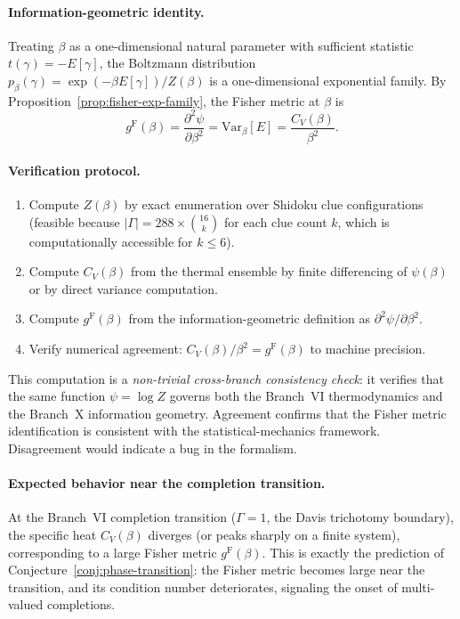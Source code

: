\documentclass[11pt]{article}
\newcommand{\Var}{\mathrm{Var}}
\newcommand{\gF}{g^{\mathrm{F}}}
\theoremstyle{remark}
\begin{document}
\paragraph{Information-geometric identity.}
Treating $\beta$ as a one-dimensional natural parameter with sufficient
statistic $t(\gamma) = -E[\gamma]$, the Boltzmann distribution
$p_\beta(\gamma) = \exp(-\beta E[\gamma])/Z(\beta)$
is a one-dimensional exponential family.  By
Proposition~\ref{prop:fisher-exp-family}, the Fisher metric at $\beta$ is
\[
\gF(\beta) = \frac{\partial^2 \psi}{\partial\beta^2}
= \Var_\beta[E] = \frac{C_V(\beta)}{\beta^2}.
\]

\paragraph{Verification protocol.}
\begin{enumerate}[label=\textnormal{(\arabic*)}, leftmargin=*]
  \item Compute $Z(\beta)$ by exact enumeration over Shidoku clue
  configurations (feasible because $|\Gamma| = 288 \times
  \binom{16}{k}$ for each clue count $k$, which is computationally accessible
  for $k \le 6$).
  \item Compute $C_V(\beta)$ from the thermal ensemble by finite differencing
  of $\psi(\beta)$ or by direct variance computation.
  \item Compute $\gF(\beta)$ from the information-geometric definition as
  $\partial^2 \psi / \partial\beta^2$.
  \item Verify numerical agreement: $C_V(\beta)/\beta^2 = \gF(\beta)$ to
  machine precision.
\end{enumerate}

This computation is a \emph{non-trivial cross-branch consistency check}: it
verifies that the same function $\psi = \log Z$ governs both the Branch~VI
thermodynamics and the Branch~X information geometry.  Agreement confirms that
the Fisher metric identification is consistent with the statistical-mechanics
framework.  Disagreement would indicate a bug in the formalism.

\paragraph{Expected behavior near the completion transition.}
At the Branch~VI completion transition ($\Gamma = 1$, the Davis trichotomy
boundary), the specific heat $C_V(\beta)$ diverges (or peaks sharply on a
finite system), corresponding to a large Fisher metric $\gF(\beta)$.  This is
exactly the prediction of Conjecture~\ref{conj:phase-transition}: the Fisher
metric becomes large near the transition, and its condition number
deteriorates, signaling the onset of multi-valued completions.
\end{document}
